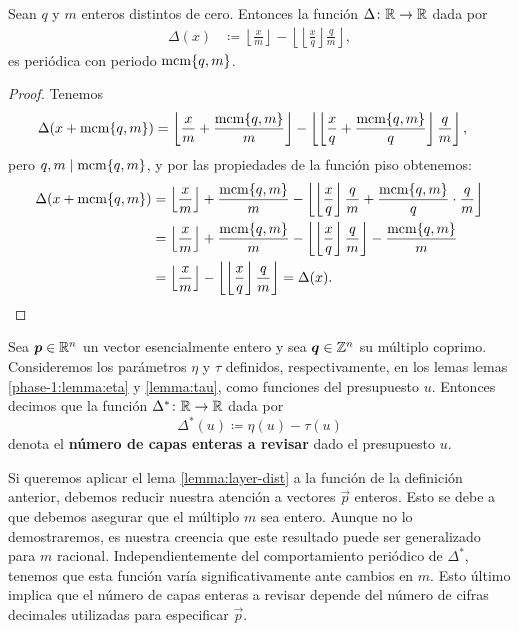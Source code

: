 \begin{lemma}
	\label{lemma:layer-dist}
	Sean $q$ y $m$ enteros distintos de cero. Entonces la función $\Delta \colon \mathbb{R} \to \mathbb{R}$ dada por
	\begin{align*}
		\Delta(x) &\coloneq \left\lfloor \frac{x}{m} \right\rfloor - \left\lfloor \left\lfloor
		\frac{x}{q} \right\rfloor \frac{q}{m} \right\rfloor,
	\end{align*}
	es periódica con periodo $\mathop{\mathrm{mcm}{\left\lbrace q, m \right\rbrace}}$.
\end{lemma}
\begin{proof}
	Tenemos
	\begin{align*}
		\Delta(x + \mathop{\mathrm{mcm}{\left\lbrace q, m \right\rbrace}})
		&= \left\lfloor \frac{x}{m} + \frac{\mathop{\mathrm{mcm}{\left\lbrace q, m \right\rbrace}}}{m} \right\rfloor
		- \left\lfloor \left\lfloor \frac{x}{q} + \frac{\mathop{\mathrm{mcm}{\left\lbrace q,m \right\rbrace}}}{q} \right\rfloor \frac{q}{m}
			\right\rfloor,
	\end{align*}
	pero $q, m \mid \mathop{\mathrm{mcm}{\left\lbrace q, m \right\rbrace}}$, y por las propiedades de la función piso obtenemos: 
	\begin{align*}
		\Delta(x + \mathop{\mathrm{mcm}{\left\lbrace q,m \right\rbrace}})
		&=
		\left\lfloor \frac{x}{m} \right\rfloor + \frac{\mathop{\mathrm{mcm}{\left\lbrace q,m \right\rbrace}}}{m}
		- \left\lfloor \left\lfloor \frac{x}{q} \right\rfloor\frac{q}{m} + 
			\frac{\mathop{\mathrm{mcm}{\left\lbrace q,m \right\rbrace}}}{q}\cdot\frac{q}{m} \right\rfloor \\
		&= 
		\left\lfloor \frac{x}{m} \right\rfloor + \frac{\mathop{\mathrm{mcm}{\left\lbrace q,m \right\rbrace}}}{m}
		- \left\lfloor \left\lfloor \frac{x}{q} \right\rfloor\frac{q}{m}\right\rfloor
		- \frac{\mathop{\mathrm{mcm}{\left\lbrace q,m \right\rbrace}}}{m} \\
		&= 
		\left\lfloor \frac{x}{m} \right\rfloor
		- \left\lfloor \left\lfloor \frac{x}{q} \right\rfloor\frac{q}{m}\right\rfloor
		= \Delta(x).
	\end{align*}
\end{proof}
\begin{definition}
	Sea $\boldsymbol{p} \in \mathbb{R}^n$ un vector esencialmente entero y sea $\boldsymbol{q} \in \mathbb{Z}^n$ su múltiplo
	coprimo. Consideremos los parámetros $\eta$ y $\tau$ definidos, respectivamente, en los lemas
	lemas \ref{phase-1:lemma:eta} y \ref{lemma:tau}, como funciones del presupuesto $u$. Entonces
	decimos que la función $\Delta^* \colon \mathbb{R} \to \mathbb{R}$ dada por
	\begin{equation}
		\label{eq:dist-layers}
		\Delta^*(u) \coloneq \eta(u) - \tau(u)
	\end{equation}
	denota el \textbf{número de capas enteras a revisar} dado el presupuesto $u$.
\end{definition}

Si queremos aplicar el lema \ref{lemma:layer-dist} a la función de la definición anterior, debemos
reducir nuestra atención a vectores $\vec{p}$ enteros. Esto se debe a que debemos asegurar que el
múltiplo $m$ sea entero. Aunque no lo demostraremos, es nuestra creencia que este resultado puede
ser generalizado para $m$ racional. Independientemente del comportamiento periódico de $\Delta^*$,
tenemos que esta función varía significativamente ante cambios en $m$. Esto último implica que el
número de capas enteras a revisar depende del número de cifras decimales utilizadas para especificar
$\vec{p}$.

